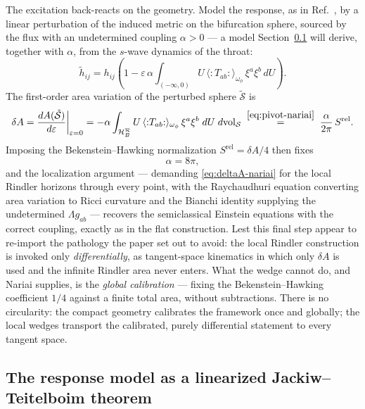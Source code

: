\documentclass[11pt]{article}
\newcommand{\Srel}{S^{\mathrm{rel}}}
\newcommand{\Nariai}{Nariai}
\begin{document}
The excitation back-reacts on the geometry. Model the response, as in Ref.~\cite{DorauMuch}, by a linear perturbation of the induced metric on the bifurcation sphere, sourced by the flux with an undetermined coupling $\alpha > 0$ --- a model Section~\ref{sec:JT} will derive, together with $\alpha$, from the $s$-wave dynamics of the throat:
\begin{equation}
\tilde{h}_{ij}
= h_{ij}\left(1 - \varepsilon\,\alpha \int_{(-\infty,0)} U\, \langle{:}T_{ab}{:}\rangle_{\omega_\phi}\, \xi^a\xi^b \, dU \right).
\label{eq:perturbation}
\end{equation}
The first-order area variation of the perturbed sphere $\tilde{\mathcal{S}}$ is
\begin{equation}
\delta A
= \frac{dA(\tilde{\mathcal{S}})}{d\varepsilon}\bigg|_{\varepsilon = 0}
= -\alpha \int_{\mathcal{H}_B^{\mathcal{R}}} U\, \langle{:}T_{ab}{:}\rangle_{\omega_\phi}\, \xi^a\xi^b \; dU\; d\mathrm{vol}_{\mathcal{S}}
\;\overset{\eqref{eq:pivot-nariai}}{=}\;
\frac{\alpha}{2\pi}\, \Srel .
\label{eq:deltaA-nariai}
\end{equation}
Imposing the Bekenstein--Hawking normalization $\Srel = \delta A / 4$ then fixes
\begin{equation}
\alpha = 8\pi,
\end{equation}
and the localization argument --- demanding \eqref{eq:deltaA-nariai} for the local Rindler horizons through every point, with the Raychaudhuri equation converting area variation to Ricci curvature and the Bianchi identity supplying the undetermined $\Lambda g_{ab}$ --- recovers the semiclassical Einstein equations with the correct coupling, exactly as in the flat construction. Lest this final step appear to re-import the pathology the paper set out to avoid: the local Rindler construction is invoked only \emph{differentially}, as tangent-space kinematics in which only $\delta A$ is used and the infinite Rindler area never enters. What the wedge cannot do, and \Nariai{} supplies, is the \emph{global calibration} --- fixing the Bekenstein--Hawking coefficient $1/4$ against a finite total area, without subtractions. There is no circularity: the compact geometry calibrates the framework once and globally; the local wedges transport the calibrated, purely differential statement to every tangent space.

\subsection{The response model as a linearized Jackiw--Teitelboim theorem}
\label{sec:JT}
\end{document}
